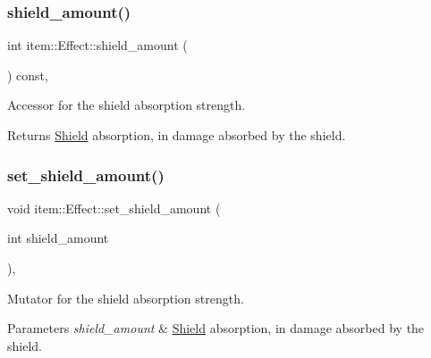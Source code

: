 \subsubsection{\texorpdfstring{shield\+\_\+amount()}{shield\_amount()}}
{\footnotesize\ttfamily int item\+::\+Effect\+::shield\+\_\+amount (\begin{DoxyParamCaption}{ }\end{DoxyParamCaption}) const\hspace{0.3cm}{\ttfamily [inline]}, {\ttfamily [noexcept]}}



Accessor for the shield absorption strength. 

\begin{DoxyReturn}{Returns}
\hyperlink{classitem_1_1_shield}{Shield} absorption, in damage absorbed by the shield. 
\end{DoxyReturn}
\mbox{\label{classitem_1_1_effect_a1610df003ab26e8ce4aafc5a13543e86}} 
\subsubsection{\texorpdfstring{set\+\_\+shield\+\_\+amount()}{set\_shield\_amount()}}
{\footnotesize\ttfamily void item\+::\+Effect\+::set\+\_\+shield\+\_\+amount (\begin{DoxyParamCaption}\item[{int}]{shield\+\_\+amount }\end{DoxyParamCaption})\hspace{0.3cm}{\ttfamily [inline]}, {\ttfamily [noexcept]}}



Mutator for the shield absorption strength. 


\begin{DoxyParams}{Parameters}
{\em shield\+\_\+amount} & \hyperlink{classitem_1_1_shield}{Shield} absorption, in damage absorbed by the shield. \\
\hline
\end{DoxyParams}
\mbox{\label{classitem_1_1_effect_abd1c6fcf2c430da628787c535cdeb527}} 
